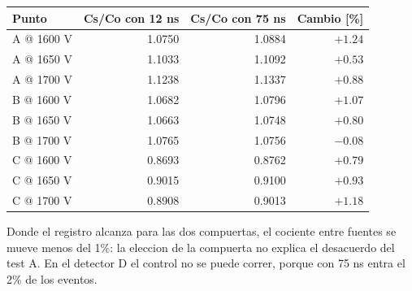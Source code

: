 \begin{tabular}{lrrr}
\toprule
\textbf{Punto} & \textbf{Cs/Co con 12 ns} & \textbf{Cs/Co con 75 ns} & \textbf{Cambio [\%]} \\
\midrule
A @ 1600 V & 1.0750 & 1.0884 & $+1.24$ \\
A @ 1650 V & 1.1033 & 1.1092 & $+0.53$ \\
A @ 1700 V & 1.1238 & 1.1337 & $+0.88$ \\
B @ 1600 V & 1.0682 & 1.0796 & $+1.07$ \\
B @ 1650 V & 1.0663 & 1.0748 & $+0.80$ \\
B @ 1700 V & 1.0765 & 1.0756 & $-0.08$ \\
C @ 1600 V & 0.8693 & 0.8762 & $+0.79$ \\
C @ 1650 V & 0.9015 & 0.9100 & $+0.93$ \\
C @ 1700 V & 0.8908 & 0.9013 & $+1.18$ \\
\bottomrule
\end{tabular}
\par\smallskip
\begin{minipage}{0.95\linewidth}\footnotesize Donde el registro alcanza para las dos compuertas, el cociente entre fuentes se mueve menos del 1\%: la eleccion de la compuerta no explica el desacuerdo del test A. En el detector D el control no se puede correr, porque con 75 ns entra el 2\% de los eventos.\end{minipage}
